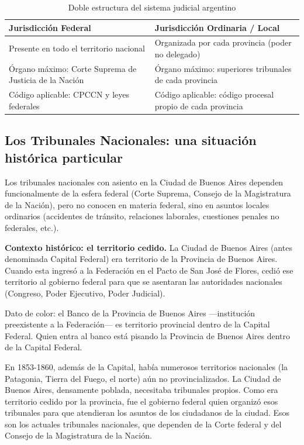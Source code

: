 \documentclass[12pt,oneside]{book}
\begin{document}
\begin{table}[H]
\centering
\caption{Doble estructura del sistema judicial argentino}
\begin{tabularx}{\textwidth}{X X}
\toprule
\textbf{Jurisdicción Federal} & \textbf{Jurisdicción Ordinaria / Local} \\
\midrule
Presente en todo el territorio nacional & Organizada por cada provincia (poder no delegado) \\
Órgano máximo: Corte Suprema de Justicia de la Nación & Órgano máximo: superiores tribunales de cada provincia \\
Código aplicable: CPCCN y leyes federales & Código aplicable: código procesal propio de cada provincia \\
\bottomrule
\end{tabularx}
\end{table}

\subsection{Los Tribunales Nacionales: una situación histórica particular}

Los tribunales nacionales con asiento en la Ciudad de Buenos Aires dependen funcionalmente de la esfera federal (Corte Suprema, Consejo de la Magistratura de la Nación), pero no conocen en materia federal, sino en asuntos locales ordinarios (accidentes de tránsito, relaciones laborales, cuestiones penales no federales, etc.).

\begin{note}
\textbf{Contexto histórico: el territorio cedido.} La Ciudad de Buenos Aires (antes denominada Capital Federal) era territorio de la Provincia de Buenos Aires. Cuando esta ingresó a la Federación en el Pacto de San José de Flores, cedió ese territorio al gobierno federal para que se asentaran las autoridades nacionales (Congreso, Poder Ejecutivo, Poder Judicial).

Dato de color: el Banco de la Provincia de Buenos Aires —institución preexistente a la Federación— es territorio provincial dentro de la Capital Federal. Quien entra al banco está pisando la Provincia de Buenos Aires dentro de la Capital Federal.
\end{note}

En 1853-1860, además de la Capital, había numerosos territorios nacionales (la Patagonia, Tierra del Fuego, el norte) aún no provincializados. La Ciudad de Buenos Aires, densamente poblada, necesitaba tribunales propios. Como era territorio cedido por la provincia, fue el gobierno federal quien organizó esos tribunales para que atendieran los asuntos de los ciudadanos de la ciudad. Esos son los actuales tribunales nacionales, que dependen de la Corte federal y del Consejo de la Magistratura de la Nación.
\end{document}
